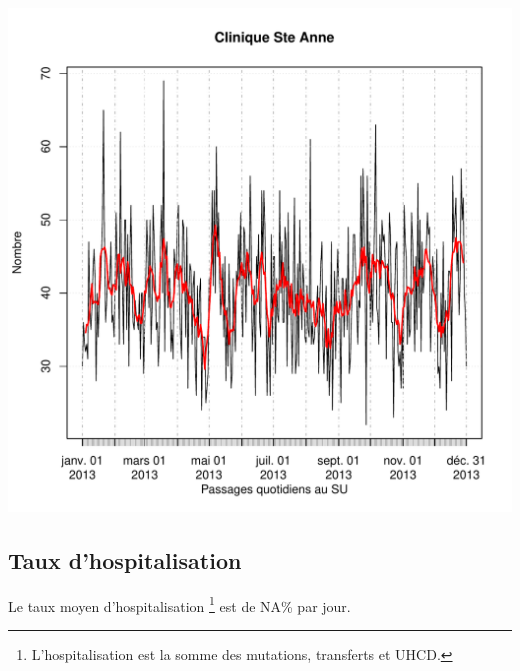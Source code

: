 \documentclass[12pt,english,french,twoside]{report}\usepackage[]{graphicx}\usepackage[]{color}
\makeatletter
\def\maxwidth{ %
  \ifdim\Gin@nat@width>\linewidth
    \linewidth
  \else
    \Gin@nat@width
  \fi
}
\newenvironment{knitrout}{}{} %
\makeatother
\begin{document}
\begin{knitrout}
\includegraphics[width=\maxwidth]{figure/stAnne_tx_moyen_passages3} 

\end{knitrout}


\subsection{Taux d'hospitalisation}

Le taux moyen d'hospitalisation \footnote{L'hospitalisation est la somme des mutations, transferts et UHCD.} est de NA\% par jour.
\end{document}
